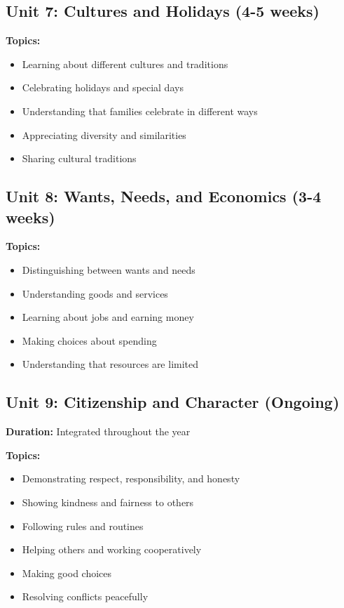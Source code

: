 \documentclass[11pt,letterpaper]{report}
\begin{document}
\subsection{Unit 7: Cultures and Holidays (4-5 weeks)}

\textbf{Topics:}
\begin{itemize}
    \item Learning about different cultures and traditions
    \item Celebrating holidays and special days
    \item Understanding that families celebrate in different ways
    \item Appreciating diversity and similarities
    \item Sharing cultural traditions
\end{itemize}

\subsection{Unit 8: Wants, Needs, and Economics (3-4 weeks)}

\textbf{Topics:}
\begin{itemize}
    \item Distinguishing between wants and needs
    \item Understanding goods and services
    \item Learning about jobs and earning money
    \item Making choices about spending
    \item Understanding that resources are limited
\end{itemize}

\subsection{Unit 9: Citizenship and Character (Ongoing)}

\textbf{Duration:} Integrated throughout the year

\textbf{Topics:}
\begin{itemize}
    \item Demonstrating respect, responsibility, and honesty
    \item Showing kindness and fairness to others
    \item Following rules and routines
    \item Helping others and working cooperatively
    \item Making good choices
    \item Resolving conflicts peacefully
\end{itemize}
\end{document}
